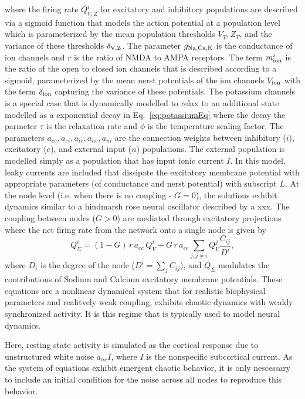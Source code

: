 \documentclass[oneside]{zHenriquesLab-StyleBioRxiv}
\begin{document}
where the firing rate $Q_{V,Z}^i$ for excitatory and inhibitory populations are described via a sigmoid function that models the action potential at a population level which is parameterized by the mean population thresholds $V_T,Z_T$, and the variance of these thresholds $\delta_{\rm V,Z}$. The parameter $g_{\rm Na,Ca,K}$ is the conductance of ion channels and $r$ is the ratio of NMDA to AMPA receptors. The term $m_{\rm ion}^i$ is the ratio of the open to closed ion channels that is described according to a sigmoid, parameterized by the mean nerst potentials of the ion channels $V_{\rm ion}$ with the term $\delta_{\rm ion}$ capturing the variance of these potentials. The potassium channels is a special case that is dynamically modelled to relax to an additional state modelled as a exponential decay in Eq.~\ref{eq:potassiumEq} where the decay the parmeter $\tau$ is the relaxation rate and $\phi$ is the temperature scaling factor. The parameters $a_{ee},a_{ei},a_{ie},a_{ne},a_{ni}$ are the connection weights between inhibitory ($i$), excitatory ($e$), and external input ($n$) populations. The external population is modelled simply as a population that has input ionic current $I$. In this model, leaky currents are included that dissipate the excitatory membrane potential with appropriate parameters (of conductance and nerst potential) with subscript $L$. At the node level (i.e. when there is no coupling - $G=0$), the solutions exhibit dynamics similar to a hindmarsh rose neural oscillator described by a xxx. The coupling between nodes ($G>0$) are mediated through excitatory projections where the net firing rate from the network onto a single node is given by 
\begin{equation}
Q_{\Sigma}^i = (1{-}G)\,r\,a_{ee}\, Q_V^{i} + G\,r\,a_{ee} \sum_{j,j\ne i}Q_V^j\frac{C_{ij}}{D^i},
\end{equation}
where $D_i$ is the degree of the node ($D^i=\sum_jC_{ij}$), and $Q_\Sigma$ modulates the contributions of Sodium and Calcium excitatory membrane potentials. These equations are a nonlinear dynamical system that for realistic biophysical parameters and realitvely weak coupling, exhibits chaotic dynamics with weakly synchronized activity. It is this regime that is typically used to model neural dynamics. 

Here, resting state activity is simulated as the cortical response due to unstructured white noise $a_{ne}I$, where $I$ is the nonspecific subcortical current. As the system of equations exhibit emergent chaotic behavior, it is only nescessary to include an initial condition for the noise across all nodes to reproduce this behavior. 
\end{document}
